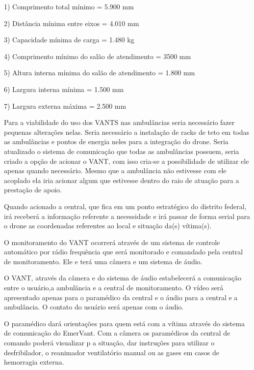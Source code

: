 1) Comprimento total mínimo = 5.900 mm

2) Distância mínima entre eixos = 4.010 mm

3) Capacidade mínima de carga = 1.480 kg

4) Comprimento mínimo do salão de atendimento = 3500 mm

5) Altura interna mínima do salão de atendimento = 1.800 mm

6) Largura interna mínima = 1.500 mm

7) Largura externa máxima = 2.500 mm

Para a viabilidade do uso dos VANTS nas ambulâncias seria necessário fazer pequenas alterações nelas. Seria necessário a instalação de racks de teto em todas as ambulâncias e pontos de energia neles para a integração do drone. Seria atualizado o sistema de comunicação que todas as ambulâncias possuem, seria criado a opção de acionar o VANT, com isso cria-se a possibilidade de utilizar ele apenas quando necessário. Mesmo que a ambulância não estivesse com ele acoplado ela iria acionar algum que estivesse dentro do raio de atuação para a prestação de apoio.

Quando acionado a central, que fica em um ponto estratégico do distrito federal, irá receberá a informação referente a necessidade e irá passar de forma serial para o drone as coordenadas referentes  ao local e situação da(s) vítima(s).

O monitoramento do VANT ocorrerá através de um sistema de controle automático por rádio frequência que será monitorado e comandado pela central de monitoramento. Ele e terá uma câmera e um sistema de áudio.

O VANT, através da câmera e do sistema de áudio estabelecerá a comunicação entre o usuário,a ambulância e a central de monitoramento. O vídeo será apresentado apenas para o paramédico da central e o áudio para a central e a ambulância. O contato do usuário será apenas com o áudio.

O paramédico dará orientações para quem está com a vítima através do sistema de comunicação do EmerVant. Com a câmera os paramédicos da central de comando poderá visualizar p a situação, dar instruções para utilizar o desfribilador, o reanimador ventilatório manual ou as gases em casos de hemorragia externa. 
